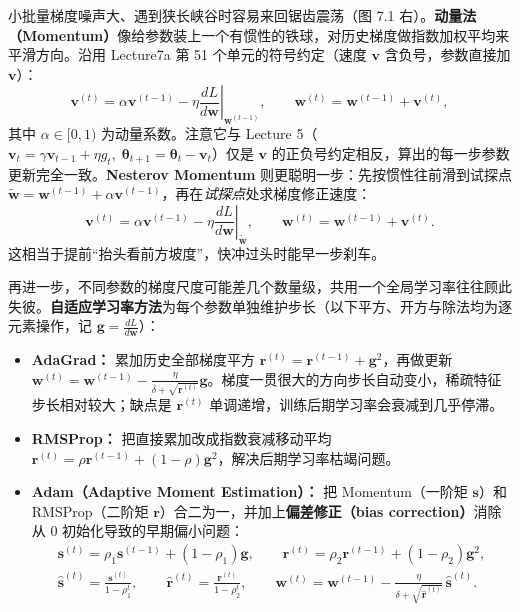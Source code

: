 小批量梯度噪声大、遇到狭长峡谷时容易来回锯齿震荡（图 7.1 右）。\textbf{动量法（Momentum）}像给参数装上一个有惯性的铁球，对历史梯度做指数加权平均来平滑方向。沿用 Lecture7a 第 51 个单元的符号约定（速度 $\mathbf{v}$ 含负号，参数直接加 $\mathbf{v}$）：
\[
\mathbf{v}^{(t)} = \alpha \mathbf{v}^{(t-1)} - \eta \left.\frac{dL}{d\mathbf{w}}\right|_{\mathbf{w}^{(t-1)}},
\qquad
\mathbf{w}^{(t)} = \mathbf{w}^{(t-1)} + \mathbf{v}^{(t)},
\tag{7.5}
\]
其中 $\alpha\in[0,1)$ 为动量系数。注意它与 Lecture 5（$\mathbf{v}_t = \gamma\mathbf{v}_{t-1} + \eta g_t,\; \boldsymbol{\theta}_{t+1}=\boldsymbol{\theta}_t - \mathbf{v}_t$）仅是 $\mathbf{v}$ 的正负号约定相反，算出的每一步参数更新完全一致。\textbf{Nesterov Momentum} 则更聪明一步：先按惯性往前滑到试探点 $\tilde{\mathbf{w}} = \mathbf{w}^{(t-1)} + \alpha\mathbf{v}^{(t-1)}$，再在\emph{试探点}处求梯度修正速度：
\[
\mathbf{v}^{(t)} = \alpha \mathbf{v}^{(t-1)} - \eta \left.\frac{dL}{d\mathbf{w}}\right|_{\tilde{\mathbf{w}}},
\qquad
\mathbf{w}^{(t)} = \mathbf{w}^{(t-1)} + \mathbf{v}^{(t)}.
\tag{7.6}
\]
这相当于提前“抬头看前方坡度”，快冲过头时能早一步刹车。

再进一步，不同参数的梯度尺度可能差几个数量级，共用一个全局学习率往往顾此失彼。\textbf{自适应学习率方法}为每个参数单独维护步长（以下平方、开方与除法均为逐元素操作，记 $\mathbf{g}=\frac{dL}{d\mathbf{w}}$）：
\begin{itemize}
\item \textbf{AdaGrad：} 累加历史全部梯度平方 $\mathbf{r}^{(t)} = \mathbf{r}^{(t-1)} + \mathbf{g}^2$，再做更新 $\mathbf{w}^{(t)} = \mathbf{w}^{(t-1)} - \frac{\eta}{\delta + \sqrt{\mathbf{r}^{(t)}}}\mathbf{g}$。梯度一贯很大的方向步长自动变小，稀疏特征步长相对较大；缺点是 $\mathbf{r}^{(t)}$ 单调递增，训练后期学习率会衰减到几乎停滞。
\item \textbf{RMSProp：} 把直接累加改成指数衰减移动平均 $\mathbf{r}^{(t)} = \rho\mathbf{r}^{(t-1)} + (1-\rho)\mathbf{g}^2$，解决后期学习率枯竭问题。
\item \textbf{Adam（Adaptive Moment Estimation）：} 把 Momentum（一阶矩 $\mathbf{s}$）和 RMSProp（二阶矩 $\mathbf{r}$）合二为一，并加上\textbf{偏差修正（bias correction）}消除从 0 初始化导致的早期偏小问题：
\[
\begin{gathered}
\mathbf{s}^{(t)} = \rho_1 \mathbf{s}^{(t-1)} + (1-\rho_1)\mathbf{g}, \qquad
\mathbf{r}^{(t)} = \rho_2 \mathbf{r}^{(t-1)} + (1-\rho_2)\mathbf{g}^2, \\[3pt]
\hat{\mathbf{s}}^{(t)} = \frac{\mathbf{s}^{(t)}}{1-\rho_1^t}, \qquad
\hat{\mathbf{r}}^{(t)} = \frac{\mathbf{r}^{(t)}}{1-\rho_2^t}, \qquad
\mathbf{w}^{(t)} = \mathbf{w}^{(t-1)} - \frac{\eta}{\delta + \sqrt{\hat{\mathbf{r}}^{(t)}}}\,\hat{\mathbf{s}}^{(t)}.
\end{gathered}
\tag{7.7}
\]
\end{itemize}


